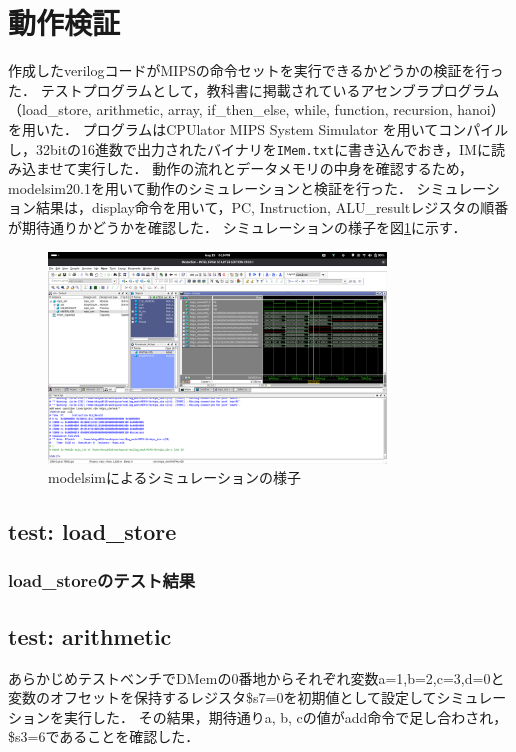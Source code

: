 \documentclass[dvipdfmx]{jsarticle}
\begin{document}
\section{動作検証}
作成したverilogコードがMIPSの命令セットを実行できるかどうかの検証を行った．
テストプログラムとして，教科書\cite{textbook}に掲載されているアセンブラプログラム（load\_store, arithmetic, array, if\_then\_else, while, function, recursion, hanoi）を用いた．
プログラムはCPUlator MIPS System Simulator \cite{mips-sim}を用いてコンパイルし，32bitの16進数で出力されたバイナリを\texttt{IMem.txt}に書き込んでおき，IMに読み込ませて実行した．
動作の流れとデータメモリの中身を確認するため，modelsim20.1を用いて動作のシミュレーションと検証を行った．
シミュレーション結果は，display命令を用いて，PC, Instruction, ALU\_resultレジスタの順番が期待通りかどうかを確認した．
シミュレーションの様子を図\ref{fig:simulation}に示す．
\begin{figure}[h]
\centering
  \includegraphics[width=0.8\textwidth]{modelsim.png}
  \caption{modelsimによるシミュレーションの様子}
  \label{fig:simulation}
\end{figure}

\subsection{test: load\_store}

\subsubsection{load\_storeのテスト結果}


\subsection{test: arithmetic}
あらかじめテストベンチでDMemの0番地からそれぞれ変数a=1,b=2,c=3,d=0と変数のオフセットを保持するレジスタ\$s7=0を初期値として設定してシミュレーションを実行した．
その結果，期待通りa, b, cの値がadd命令で足し合わされ，\$s3=6であることを確認した．
\end{document}
